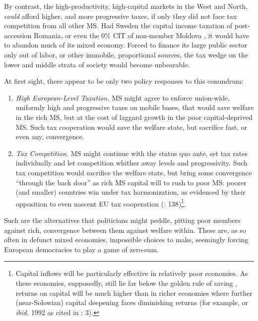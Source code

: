 By contrast, the high-productivity, high-capital markets in the West and North, \emph{could} afford higher, and more progressive taxes, if only they did not face tax competition from all other \gls{MS}. Had Sweden the capital income taxation of post-accession Romania, or even the 0\% \gls{CIT} of non-member Moldova \citep{Piatkowski2008}, it would have to abandon much of its mixed economy. Forced to finance its large public sector only out of labor, or other immobile, proportional sources, the tax wedge on the lower and middle strata of society would become unbearable. %

At first sight, there appear to be only two policy responses to this conundrum:
\begin{enumerate}
	\item \emph{High European-Level Taxation.} \gls{MS} might agree to enforce union-wide, uniformly high and progressive taxes on mobile bases, that would save welfare in the rich \gls{MS}, but at the cost of laggard growth in the poor capital-deprived \gls{MS}. Such tax cooperation would save the welfare state, but sacrifice fast, or even any, convergence.
	\item \emph{Tax Competition.} \gls{MS} might continue with the status quo ante, set tax rates individually and let competition whither away levels and progressivity. Such tax competition would sacrifice the welfare state, but bring some convergence ``through the back door'' as rich \gls{MS} capital will to rush to poor \gls{MS}: poorer (and smaller) countries win under tax harmonization, as evidenced by their opposition to even nascent \gls{EU} tax cooperation (\citealt{Kellermann2009}: 138)\footnote{
		Capital inflows will be particularly effective in relatively poor economies. As these economies, supposedly, still lie far below the golden rule of saving \citep{Solow1956}, returns on capital will be much higher than in richer economies where further (near-Solowian) capital deepening faces diminishing returns (for example, \citealt{Barro1995} or \emph{ibid.} 1992 as cited in \citealt{Beckfield2009}: 3).}.
\end{enumerate}

Such are the alternatives that politicians might peddle, pitting poor members against rich, convergence between them against welfare within. These are, as so often in defunct mixed economies, impossible choices to make, seemingly forcing European democracies to play a game of zero-sum.

